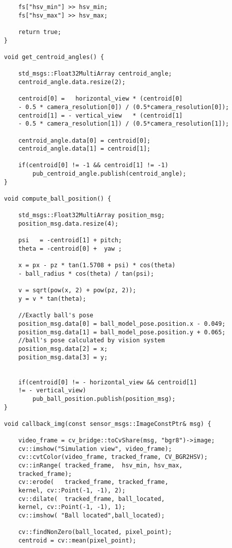 \begin{lstlisting}
    fs["hsv_min"] >> hsv_min;
    fs["hsv_max"] >> hsv_max;

    return true;
}

void get_centroid_angles() {

    std_msgs::Float32MultiArray centroid_angle;
    centroid_angle.data.resize(2);

    centroid[0] =   horizontal_view * (centroid[0] 
    - 0.5 * camera_resolution[0]) / (0.5*camera_resolution[0]);
    centroid[1] = - vertical_view   * (centroid[1] 
    - 0.5 * camera_resolution[1]) / (0.5*camera_resolution[1]);

    centroid_angle.data[0] = centroid[0]; 
    centroid_angle.data[1] = centroid[1];

    if(centroid[0] != -1 && centroid[1] != -1)
        pub_centroid_angle.publish(centroid_angle);
}

void compute_ball_position() { 

    std_msgs::Float32MultiArray position_msg;
    position_msg.data.resize(4);

    psi   = -centroid[1] + pitch;
    theta = -centroid[0] +  yaw ;
    
    x = px - pz * tan(1.5708 + psi) * cos(theta) 
    - ball_radius * cos(theta) / tan(psi);

    v = sqrt(pow(x, 2) + pow(pz, 2));
    y = v * tan(theta);

    //Exactly ball's pose
    position_msg.data[0] = ball_model_pose.position.x - 0.049;
    position_msg.data[1] = ball_model_pose.position.y + 0.065;
    //ball's pose calculated by vision system
    position_msg.data[2] = x;
    position_msg.data[3] = y;


    if(centroid[0] != - horizontal_view && centroid[1] 
    != - vertical_view)
        pub_ball_position.publish(position_msg);    
}

void callback_img(const sensor_msgs::ImageConstPtr& msg) {
    
    video_frame = cv_bridge::toCvShare(msg, "bgr8")->image;
    cv::imshow("Simulation view", video_frame);
    cv::cvtColor(video_frame, tracked_frame, CV_BGR2HSV);
    cv::inRange( tracked_frame,  hsv_min, hsv_max, 
    tracked_frame);
    cv::erode(   tracked_frame, tracked_frame, 
    kernel, cv::Point(-1, -1), 2);
    cv::dilate(  tracked_frame, ball_located, 
    kernel, cv::Point(-1, -1), 1);
    cv::imshow( "Ball located",ball_located);

    cv::findNonZero(ball_located, pixel_point);
    centroid = cv::mean(pixel_point);


\end{lstlisting}
